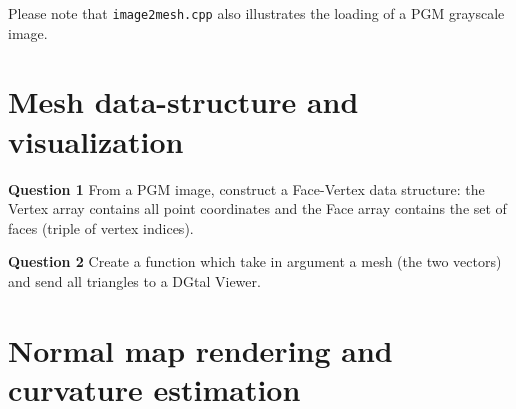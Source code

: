\documentclass[a4paper, 11pt]{article}
\begin{document}
Please note that \texttt{image2mesh.cpp} also illustrates the loading
of a PGM grayscale image.


\section{Mesh data-structure and visualization}

{\bf Question 1}  From a PGM image, construct a Face-Vertex data
structure: the Vertex array contains all point coordinates and the
Face array contains the set of faces (triple of vertex indices).


{\bf Question 2} Create a function which take in argument a mesh (the
two vectors) and send all triangles to a DGtal Viewer.



\section{Normal map rendering and curvature estimation}
\end{document}
